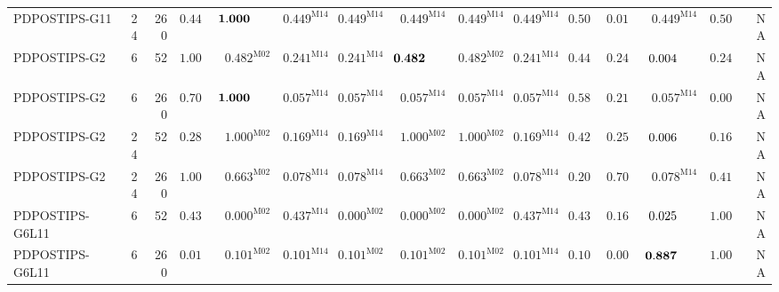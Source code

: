 \begin{longtable}{@{}lrrrrrrrrrrrrrr@{}}
PDPOSTIPS-G11 & 24 & 260 & $\mathbf{0.449}$ & $\mathbf{1.000}\hphantom{^{\mathrm{M00}}}$ & $\mathbf{0.449}^{\mathrm{M14}}$ & $\mathbf{0.449}^{\mathrm{M14}}$ & $\mathbf{0.449}^{\mathrm{M14}}$ & $\mathbf{0.449}^{\mathrm{M14}}$ & $\mathbf{0.449}^{\mathrm{M14}}$ & $\mathbf{0.506}$ & $0.012$ & $\mathbf{0.449}^{\mathrm{M14}}$ & $\mathbf{0.506}$ & \textsc{NA} \\
PDPOSTIPS-G2 & 6 & 52 & $\mathbf{1.000}$ & $\mathbf{0.482}^{\mathrm{M02}}$ & $\mathbf{0.241}^{\mathrm{M14}}$ & $\mathbf{0.241}^{\mathrm{M14}}$ & $\mathbf{0.482}\hphantom{^{\mathrm{M00}}}$ & $\mathbf{0.482}^{\mathrm{M02}}$ & $\mathbf{0.241}^{\mathrm{M14}}$ & $\mathbf{0.445}$ & $\mathbf{0.245}$ & $0.004\hphantom{^{\mathrm{M00}}}$ & $\mathbf{0.245}$ & \textsc{NA} \\
PDPOSTIPS-G2 & 6 & 260 & $\mathbf{0.701}$ & $\mathbf{1.000}\hphantom{^{\mathrm{M00}}}$ & $0.057^{\mathrm{M14}}$ & $0.057^{\mathrm{M14}}$ & $0.057^{\mathrm{M14}}$ & $0.057^{\mathrm{M14}}$ & $0.057^{\mathrm{M14}}$ & $\mathbf{0.581}$ & $\mathbf{0.215}$ & $0.057^{\mathrm{M14}}$ & $0.001$ & \textsc{NA} \\
PDPOSTIPS-G2 & 24 & 52 & $\mathbf{0.283}$ & $\mathbf{1.000}^{\mathrm{M02}}$ & $\mathbf{0.169}^{\mathrm{M14}}$ & $\mathbf{0.169}^{\mathrm{M14}}$ & $\mathbf{1.000}^{\mathrm{M02}}$ & $\mathbf{1.000}^{\mathrm{M02}}$ & $\mathbf{0.169}^{\mathrm{M14}}$ & $\mathbf{0.426}$ & $\mathbf{0.255}$ & $0.006\hphantom{^{\mathrm{M00}}}$ & $\mathbf{0.169}$ & \textsc{NA} \\
PDPOSTIPS-G2 & 24 & 260 & $\mathbf{1.000}$ & $\mathbf{0.663}^{\mathrm{M02}}$ & $0.078^{\mathrm{M14}}$ & $0.078^{\mathrm{M14}}$ & $\mathbf{0.663}^{\mathrm{M02}}$ & $\mathbf{0.663}^{\mathrm{M02}}$ & $0.078^{\mathrm{M14}}$ & $\mathbf{0.200}$ & $\mathbf{0.701}$ & $0.078^{\mathrm{M14}}$ & $\mathbf{0.419}$ & \textsc{NA} \\
PDPOSTIPS-G6L11 & 6 & 52 & $\mathbf{0.437}$ & $0.000^{\mathrm{M02}}$ & $\mathbf{0.437}^{\mathrm{M14}}$ & $0.000^{\mathrm{M02}}$ & $0.000^{\mathrm{M02}}$ & $0.000^{\mathrm{M02}}$ & $\mathbf{0.437}^{\mathrm{M14}}$ & $\mathbf{0.437}$ & $\mathbf{0.162}$ & $0.025\hphantom{^{\mathrm{M00}}}$ & $\mathbf{1.000}$ & \textsc{NA} \\
PDPOSTIPS-G6L11 & 6 & 260 & $0.018$ & $\mathbf{0.101}^{\mathrm{M02}}$ & $\mathbf{0.101}^{\mathrm{M14}}$ & $\mathbf{0.101}^{\mathrm{M02}}$ & $\mathbf{0.101}^{\mathrm{M02}}$ & $\mathbf{0.101}^{\mathrm{M02}}$ & $\mathbf{0.101}^{\mathrm{M14}}$ & $\mathbf{0.101}$ & $0.000$ & $\mathbf{0.887}\hphantom{^{\mathrm{M00}}}$ & $\mathbf{1.000}$ & \textsc{NA} \\

\end{longtable}
